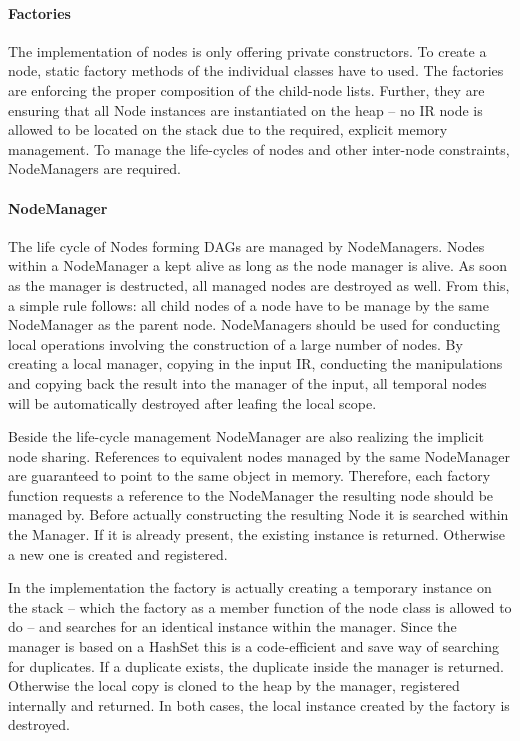 \paragraph{Factories}  \label{sec:Compiler.Core.NodesAndManagers.Factories}
The implementation of nodes is only offering private constructors. To create a
node, static factory methods of the individual classes have to used. The
factories are enforcing the proper composition of the child-node lists. Further,
they are ensuring that all Node instances are instantiated on the heap -- no IR
node is allowed to be located on the stack due to the required, explicit memory
management. To manage the life-cycles of nodes and other inter-node constraints,
NodeManagers are required.

\paragraph{NodeManager}  The life cycle of Nodes forming
DAGs are managed by NodeManagers. Nodes within a NodeManager a kept alive as
long as the node manager is alive. As soon as the manager is destructed, all
managed nodes are destroyed as well. From this, a simple rule follows: all child
nodes of a node have to be manage by the same NodeManager as the parent node.
NodeManagers should be used for conducting local operations involving the
construction of a large number of nodes. By creating a local manager, copying in
the input IR, conducting the manipulations and copying back the result into the
manager of the input, all temporal nodes will be automatically destroyed
after leafing the local scope.

Beside the life-cycle management NodeManager are also realizing the implicit
node sharing. References to equivalent nodes managed by the same NodeManager are
guaranteed to point to the same object in memory. Therefore, each factory
function requests a reference to the NodeManager the resulting node should be
managed by. Before actually constructing the resulting Node it is searched
within the Manager. If it is already present, the existing instance is returned.
Otherwise a new one is created and registered.

In the implementation the factory is actually creating a temporary instance on
the stack -- which the factory as a member function of the node class is
allowed to do -- and searches for an identical instance within the manager.
Since the manager is based on a HashSet this is a code-efficient and save way of
searching for duplicates. If a duplicate exists, the duplicate inside the
manager is returned. Otherwise the local copy is cloned to the heap by the
manager, registered internally and returned. In both cases, the local instance
created by the factory is destroyed.


